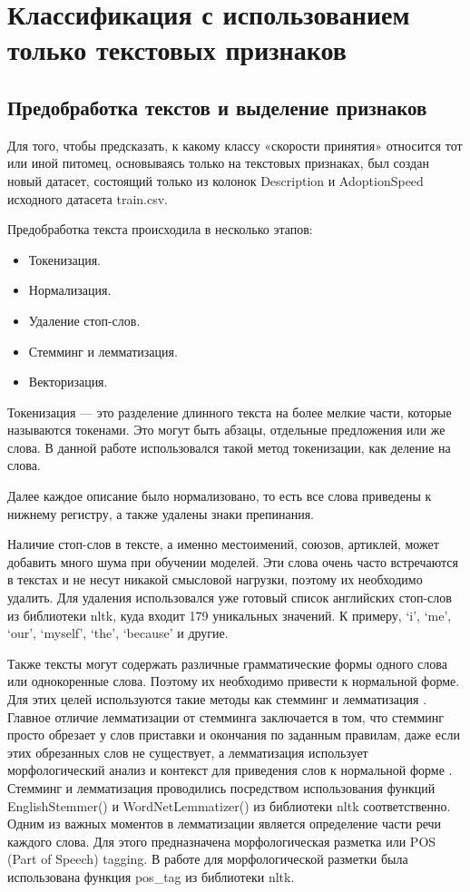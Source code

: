 \documentclass[14pt]{mmcs_article}
\begin{document}
\newpage
\section{Классификация с использованием только \mbox{текстовых} признаков}

\subsection{Предобработка текстов и выделение \mbox{признаков}}

Для того, чтобы предсказать, к какому классу «скорости принятия» относится тот или иной питомец, основываясь только на текстовых признаках, был создан новый датасет, состоящий только из колонок Description и AdoptionSpeed исходного датасета train.csv.

Предобработка текста происходила в несколько этапов:

\begin{itemize}
	\item Токенизация.
	\item Нормализация.
	\item Удаление стоп-слов.
	\item Стемминг и лемматизация.
	\item Векторизация.
\end{itemize}

Токенизация --- это разделение длинного текста на более мелкие части, которые называются токенами. Это могут быть абзацы, отдельные предложения или же слова. В данной работе использовался такой метод токенизации, как деление на слова.
 
Далее каждое описание было нормализовано, то есть все слова приведены к нижнему регистру, а также удалены знаки препинания. 

Наличие стоп-слов в тексте, а именно местоимений, союзов, артиклей, может добавить много шума при обучении моделей. Эти слова очень часто встречаются в текстах и не несут никакой смысловой нагрузки, поэтому их необходимо удалить. Для удаления использовался уже готовый список английских стоп-слов из библиотеки nltk, куда входит 179 уникальных значений. К примеру, `i', `me', `our', `myself', `the', `because' и другие. 

Также тексты могут содержать различные грамматические формы одного слова или однокоренные слова. Поэтому их необходимо привести к нормальной форме. Для этих целей используются такие методы как стемминг и лемматизация \cite{lib:stemlem}. Главное отличие лемматизации от стемминга заключается в том, что стемминг просто обрезает у слов приставки и окончания по заданным правилам, даже если этих обрезанных слов не существует, а лемматизация использует морфологический анализ и контекст для приведения слов к нормальной форме \cite{lib:langproc}. Стемминг и лемматизация проводились посредством использования функций EnglishStemmer() и WordNetLemmatizer() из библиотеки nltk соответственно. Одним из важных моментов в лемматизации является определение части речи каждого слова. Для этого предназначена морфологическая разметка или POS (Part of Speech) tagging. В работе для морфологической разметки была использована функция pos\_tag из библиотеки nltk.
\end{document}
